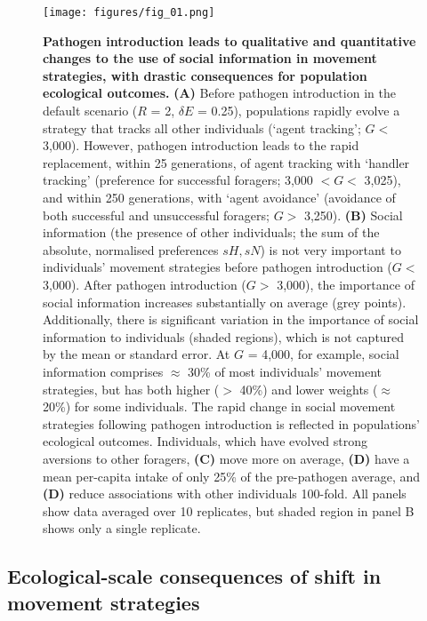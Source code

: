 \begin{figure}[!h]
    \centering
    \texttt{[image: figures/fig\_01.png]}
    \caption{
        \textbf{Pathogen introduction leads to qualitative and quantitative changes to the use of social information in movement strategies, with drastic consequences for population ecological outcomes.}
        \textbf{(A)} Before pathogen introduction in the default scenario ($R$ = 2, $\delta E$ = 0.25), populations rapidly evolve a strategy that tracks all other individuals (`agent tracking'; $G <$ 3,000).
        However, pathogen introduction leads to the rapid replacement, within 25 generations, of agent tracking with `handler tracking' (preference for successful foragers; 3,000 $< G <$ 3,025), and within 250 generations, with `agent avoidance' (avoidance of both successful and unsuccessful foragers; $G >$ 3,250).
        \textbf{(B)} Social information (the presence of other individuals; the sum of the absolute, normalised preferences $sH, sN$) is not very important to individuals' movement strategies before pathogen introduction ($G <$ 3,000).
        After pathogen introduction ($G >$ 3,000), the importance of social information increases substantially on average (grey points).
        Additionally, there is significant variation in the importance of social information to individuals (shaded regions), which is not captured by the mean or standard error.
        At $G$ = 4,000, for example, social information comprises $\approx$ 30\% of most individuals' movement strategies, but has both higher ($>$ 40\%) and lower weights ($\approx$ 20\%) for some individuals.
        The rapid change in social movement strategies following pathogen introduction is reflected in populations' ecological outcomes.
        Individuals, which have evolved strong aversions to other foragers, \textbf{(C)} move more on average, \textbf{(D)} have a mean per-capita intake of only 25\% of the pre-pathogen average, and \textbf{(D)} reduce associations with other individuals 100-fold.
        All panels show data averaged over 10 replicates, but shaded region in panel B shows only a single replicate.
    }
    \label{patho_fig_01}
\end{figure}

\subsection*{Ecological-scale consequences of shift in movement strategies}

